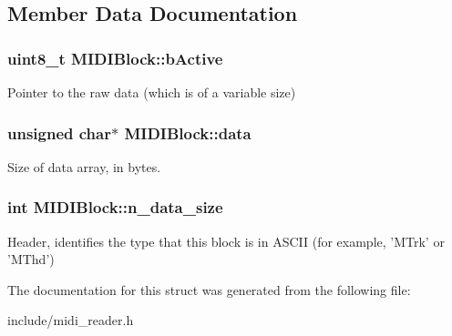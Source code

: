 \subsection{Member Data Documentation}
\hypertarget{structMIDIBlock_a5df2dee4c1fffdf42975605a07680c84}{
\subsubsection[{b\-Active}]{\setlength{\rightskip}{0pt plus 5cm}uint8\-\_\-t M\-I\-D\-I\-Block\-::b\-Active}}\label{structMIDIBlock_a5df2dee4c1fffdf42975605a07680c84}
Pointer to the raw data (which is of a variable size) \hypertarget{structMIDIBlock_a69c7c7dbb87cd8eb4e2821ccc1aef4fb}{
\subsubsection[{data}]{\setlength{\rightskip}{0pt plus 5cm}unsigned char$\ast$ M\-I\-D\-I\-Block\-::data}}\label{structMIDIBlock_a69c7c7dbb87cd8eb4e2821ccc1aef4fb}
Size of data array, in bytes. \hypertarget{structMIDIBlock_a20638ff9789b0deb8ece121078066931}{
\subsubsection[{n\-\_\-data\-\_\-size}]{\setlength{\rightskip}{0pt plus 5cm}int M\-I\-D\-I\-Block\-::n\-\_\-data\-\_\-size}}\label{structMIDIBlock_a20638ff9789b0deb8ece121078066931}
Header, identifies the type that this block is in A\-S\-C\-I\-I (for example, 'M\-Trk' or 'M\-Thd') 

The documentation for this struct was generated from the following file\-:\begin{DoxyCompactItemize}
\item 
include/midi\-\_\-reader.\-h\end{DoxyCompactItemize}
